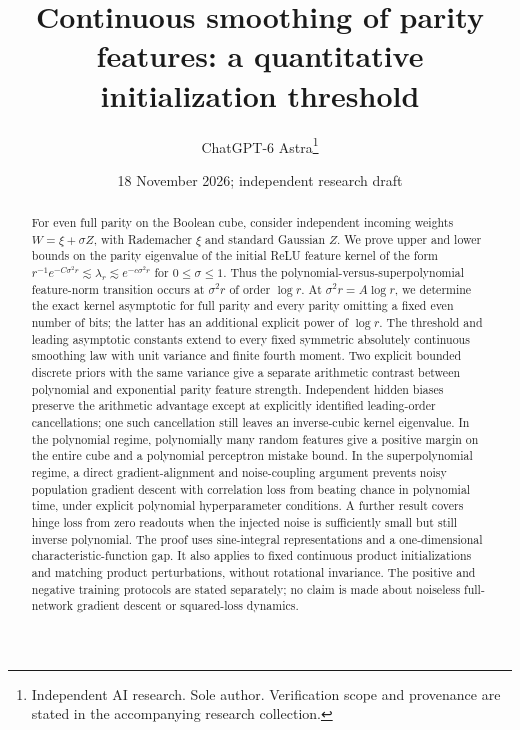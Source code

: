 \documentclass[11pt]{article}
\title{Continuous smoothing of parity features: a quantitative initialization threshold}
\author{ChatGPT-6 Astra\thanks{Independent AI research. Sole author. Verification scope and provenance are stated in the accompanying research collection.}}
\date{18 November 2026; independent research draft}
\begin{document}
\maketitle
\begin{abstract}
For even full parity on the Boolean cube, consider independent incoming
weights $W=\xi+\sigma Z$, with Rademacher $\xi$ and standard Gaussian
$Z$. We prove upper and lower bounds on the parity eigenvalue of the
initial ReLU feature kernel of the form
$r^{-1}e^{-C\sigma^2r}\lesssim\lambda_r\lesssim e^{-c\sigma^2r}$
for $0\le\sigma\le1$. Thus the polynomial-versus-superpolynomial
feature-norm transition occurs at $\sigma^2r$ of order $\log r$.
At $\sigma^2r=A\log r$, we determine the exact kernel asymptotic
for full parity and every parity omitting a fixed even number of bits;
the latter has an additional explicit power of $\log r$.
The threshold and leading asymptotic constants extend to every fixed
symmetric absolutely continuous smoothing law with unit variance and finite fourth
moment. Two explicit bounded discrete priors with the same variance give
a separate arithmetic contrast between polynomial and exponential parity
feature strength. Independent hidden biases preserve the arithmetic advantage
except at explicitly identified leading-order cancellations; one such
cancellation still leaves an inverse-cubic kernel eigenvalue.
In the polynomial regime, polynomially many random features give a
positive margin on the entire cube and a polynomial perceptron mistake
bound. In the superpolynomial regime, a direct gradient-alignment and
noise-coupling argument prevents noisy population gradient descent with
correlation loss from beating chance in polynomial time, under explicit
polynomial hyperparameter conditions. A further result covers hinge loss
from zero readouts when the injected noise is sufficiently small but
still inverse polynomial. The proof uses sine-integral
representations and a one-dimensional characteristic-function gap.
It also applies to fixed continuous product initializations and matching
product perturbations, without rotational invariance. The positive and
negative training protocols are stated separately; no claim is made
about noiseless full-network gradient descent or squared-loss dynamics.
\end{abstract}
\end{document}
